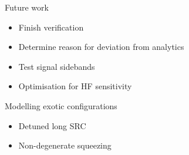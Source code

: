 \documentclass[12pt]{beamer}
\begin{document}
\begin{frame}{Future work}
\begin{itemize}
\item Finish verification
\item Determine reason for deviation from analytics
\item Test signal sidebands
\item Optimisation for HF sensitivity
\end{itemize}
\begin{block}{Modelling exotic configurations}
\begin{itemize}
\item Detuned long SRC
\item Non-degenerate squeezing
\end{itemize}
\end{block}
\end{frame}


\begin{frame}
\titlepage 
\end{frame}

\end{document}
